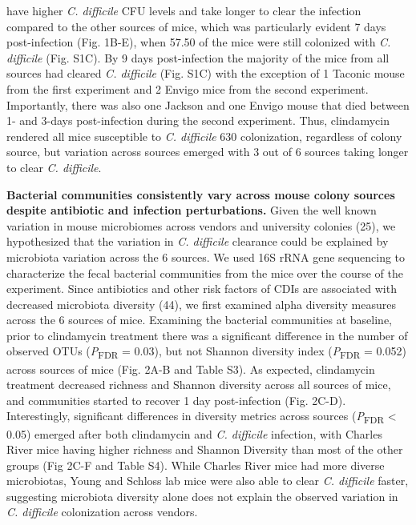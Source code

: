 \documentclass[11pt,]{article}
\begin{document}
have higher \emph{C. difficile} CFU levels and take longer to clear the
infection compared to the other sources of mice, which was particularly
evident 7 days post-infection (Fig. 1B-E), when 57.50 of the mice were
still colonized with \emph{C. difficile} (Fig. S1C). By 9 days
post-infection the majority of the mice from all sources had cleared
\emph{C. difficile} (Fig. S1C) with the exception of 1 Taconic mouse
from the first experiment and 2 Envigo mice from the second experiment.
Importantly, there was also one Jackson and one Envigo mouse that died
between 1- and 3-days post-infection during the second experiment. Thus,
clindamycin rendered all mice susceptible to \emph{C. difficile} 630
colonization, regardless of colony source, but variation across sources
emerged with 3 out of 6 sources taking longer to clear \emph{C.
difficile}.

\textbf{Bacterial communities consistently vary across mouse colony
sources despite antibiotic and infection perturbations.} Given the well
known variation in mouse microbiomes across vendors and university
colonies (25), we hypothesized that the variation in \emph{C. difficile}
clearance could be explained by microbiota variation across the 6
sources. We used 16S rRNA gene sequencing to characterize the fecal
bacterial communities from the mice over the course of the experiment.
Since antibiotics and other risk factors of CDIs are associated with
decreased microbiota diversity (44), we first examined alpha diversity
measures across the 6 sources of mice. Examining the bacterial
communities at baseline, prior to clindamycin treatment there was a
significant difference in the number of observed OTUs
(\emph{P}\textsubscript{FDR} = 0.03), but not Shannon diversity index
(\emph{P}\textsubscript{FDR} = 0.052) across sources of mice (Fig. 2A-B
and Table S3). As expected, clindamycin treatment decreased richness and
Shannon diversity across all sources of mice, and communities started to
recover 1 day post-infection (Fig. 2C-D). Interestingly, significant
differences in diversity metrics across sources
(\emph{P}\textsubscript{FDR} \textless{} 0.05) emerged after both
clindamycin and \emph{C. difficile} infection, with Charles River mice
having higher richness and Shannon Diversity than most of the other
groups (Fig 2C-F and Table S4). While Charles River mice had more
diverse microbiotas, Young and Schloss lab mice were also able to clear
\emph{C. difficile} faster, suggesting microbiota diversity alone does
not explain the observed variation in \emph{C. difficile} colonization
across vendors.
\end{document}
